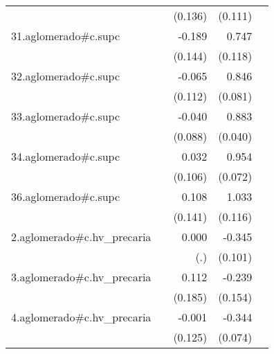 {\begin{longtable}{l*{4}{D{.}{.}{-1}}}
            &                     &     (0.136)         &     (0.111)         &                     \\
\addlinespace
31.aglomerado#c.supc&                     &      -0.189         &       0.747\sym{***}&                     \\
            &                     &     (0.144)         &     (0.118)         &                     \\
\addlinespace
32.aglomerado#c.supc&                     &      -0.065         &       0.846\sym{***}&                     \\
            &                     &     (0.112)         &     (0.081)         &                     \\
\addlinespace
33.aglomerado#c.supc&                     &      -0.040         &       0.883\sym{***}&                     \\
            &                     &     (0.088)         &     (0.040)         &                     \\
\addlinespace
34.aglomerado#c.supc&                     &       0.032         &       0.954\sym{***}&                     \\
            &                     &     (0.106)         &     (0.072)         &                     \\
\addlinespace
36.aglomerado#c.supc&                     &       0.108         &       1.033\sym{***}&                     \\
            &                     &     (0.141)         &     (0.116)         &                     \\
\addlinespace
2.aglomerado#c.hv\_precaria&                     &       0.000         &      -0.345\sym{***}&                     \\
            &                     &         (.)         &     (0.101)         &                     \\
\addlinespace
3.aglomerado#c.hv\_precaria&                     &       0.112         &      -0.239         &                     \\
            &                     &     (0.185)         &     (0.154)         &                     \\
\addlinespace
4.aglomerado#c.hv\_precaria&                     &      -0.001         &      -0.344\sym{***}&                     \\
            &                     &     (0.125)         &     (0.074)         &                     \\

\end{longtable}}
